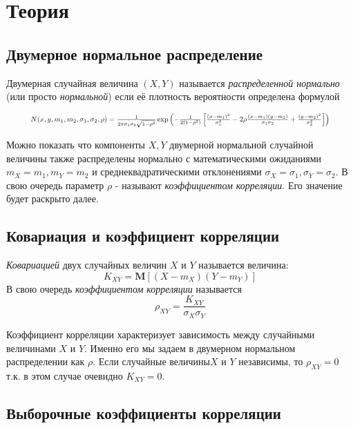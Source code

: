 \documentclass[12pt,a4paper]{article}
\begin{document}
\pagebreak

\section{Теория}
\subsection{Двумерное нормальное распределение}
Двумерная случайная величина $(X,Y)$ называется \textit{распределенной нормально} (или просто \textit{нормальной}) если её плотность вероятности определена формулой

\begin{equation}
\resizebox{.9\hsize}{!}{$
	N(x, y, m_1, m_2, \sigma_1, \sigma_2, \rho) = \frac{1}{2\pi\sigma_1\sigma_2\sqrt{1-\rho^2}}
	\exp{
		\left(-\frac{1}{2(1-\rho^2)} 
		\left[\frac{(x - m_1)^2}{\sigma_1^2} -
		2\rho\frac{(x - m_1)(y - m_2)}{\sigma_1\sigma_2} +
		\frac{(y - m_2)^2}{\sigma_2^2}\right]\right)
	}$}\label{eq:1}
\end{equation}

Можно показать \cite[стр. 133-134]{verrazdely} что компоненты $X,Y$ двумерной нормальной случайной величины также распределены нормально с математическими ожиданиями $m_X = m_1, m_Y = m_2$ и среднеквадратическими отклонениями $\sigma_X = \sigma_1, \sigma_Y = \sigma_2$. В свою очередь параметр $\rho$ - называют \textit{коэффициентом корреляции}. Его значение будет раскрыто далее.

\subsection{Ковариация и коэффициент корреляции}
\textit{Ковариацией} двух случайных величин $X$ и $Y$ называется величина:
\begin{equation}
	K_{XY} = \textbf{M} \left[ (X-m_X)(Y-m_Y) \right]
\end{equation}
В свою очередь \textit{коэффициентом корреляции} называется
\begin{equation}
	\rho_{XY} = \frac{K_{XY}}{\sigma_X \sigma_Y}
\end{equation}

Коэффициент корреляции характеризует зависимость между случайными величинами $X$ и $Y$. Именно его мы задаем в двумерном нормальном распределении как $\rho$. Если случайные величины$X$ и $Y$  независимы, то $\rho_{XY} = 0$ т.к. в этом случае очевидно $K_{XY} = 0$.

\subsection{Выборочные коэффициенты корреляции}
\end{document}
